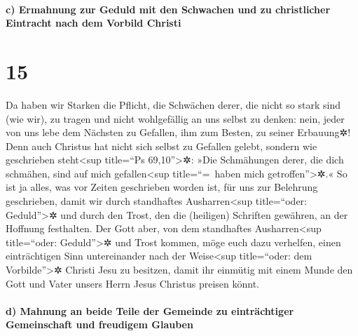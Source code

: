 \hypertarget{c-ermahnung-zur-geduld-mit-den-schwachen-und-zu-christlicher-eintracht-nach-dem-vorbild-christi}{%
\paragraph{c) Ermahnung zur Geduld mit den Schwachen und zu christlicher
Eintracht nach dem Vorbild
Christi}\label{c-ermahnung-zur-geduld-mit-den-schwachen-und-zu-christlicher-eintracht-nach-dem-vorbild-christi}}

\hypertarget{section-14}{%
\section{15}\label{section-14}}

 Da haben wir Starken die Pflicht, die Schwächen derer,
die nicht so stark sind (wie wir), zu tragen und nicht wohlgefällig an
uns selbst zu denken:  nein, jeder von uns lebe dem
Nächsten zu Gefallen, ihm zum Besten, zu seiner Erbauung✲!
 Denn auch Christus hat nicht sich selbst zu Gefallen
gelebt, sondern wie geschrieben steht\textless sup title=``Ps
69,10''\textgreater✲: »Die Schmähungen derer, die dich schmähen, sind
auf mich gefallen\textless sup title=``=~haben mich
getroffen''\textgreater✲.«  So ist ja alles, was vor
Zeiten geschrieben worden ist, für uns zur Belehrung geschrieben, damit
wir durch standhaftes Ausharren\textless sup title=``oder:
Geduld''\textgreater✲ und durch den Trost, den die (heiligen) Schriften
gewähren, an der Hoffnung festhalten.  Der Gott aber, von
dem standhaftes Ausharren\textless sup title=``oder:
Geduld''\textgreater✲ und Trost kommen, möge euch dazu verhelfen, einen
einträchtigen Sinn untereinander nach der Weise\textless sup
title=``oder: dem Vorbilde''\textgreater✲ Christi Jesu zu besitzen,
 damit ihr einmütig mit einem Munde den Gott und Vater
unsers Herrn Jesus Christus preisen könnt.

\hypertarget{d-mahnung-an-beide-teile-der-gemeinde-zu-eintruxe4chtiger-gemeinschaft-und-freudigem-glauben}{%
\paragraph{d) Mahnung an beide Teile der Gemeinde zu einträchtiger
Gemeinschaft und freudigem
Glauben}\label{d-mahnung-an-beide-teile-der-gemeinde-zu-eintruxe4chtiger-gemeinschaft-und-freudigem-glauben}}

